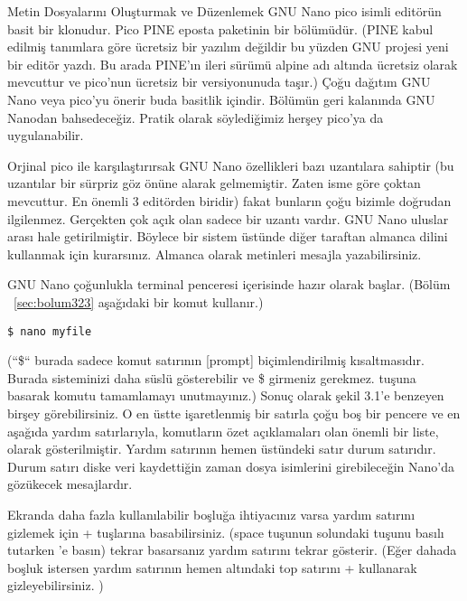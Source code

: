 \begin{section}{Metin Dosyalarını Oluşturmak ve Düzenlemek}
GNU Nano pico isimli editörün basit bir klonudur. Pico PINE eposta paketinin bir bölümüdür. (PINE kabul edilmiş tanımlara göre ücretsiz bir yazılım değildir bu yüzden GNU projesi yeni bir editör yazdı. Bu arada PINE’ın ileri sürümü alpine adı altında ücretsiz olarak mevcuttur ve pico’nun ücretsiz bir versiyonunuda taşır.) Çoğu dağıtım GNU Nano veya pico’yu önerir buda basitlik içindir. Bölümün geri kalanında GNU Nanodan bahsedeceğiz. Pratik olarak söylediğimiz herşey pico'ya da uygulanabilir.

Orjinal pico ile karşılaştırırsak GNU Nano özellikleri bazı uzantılara sahiptir (bu uzantılar bir sürpriz göz önüne alarak gelmemiştir. Zaten isme göre çoktan mevcuttur. En önemli 3 editörden biridir) fakat bunların çoğu bizimle doğrudan ilgilenmez. Gerçekten çok açık olan sadece bir uzantı vardır. GNU Nano uluslar arası hale getirilmiştir. Böylece bir sistem üstünde diğer taraftan almanca dilini kullanmak için kurarsınız.  Almanca olarak metinleri mesajla yazabilirsiniz.

GNU Nano çoğunlukla terminal penceresi içerisinde hazır olarak başlar. (Bölüm ~\ref{sec:bolum323} aşağıdaki bir komut kullanır.)

\begin{verbatim}
$ nano myfile
\end{verbatim}

(“\$“ burada sadece komut satırının [prompt] biçimlendirilmiş kısaltmasıdır. Burada sisteminizi daha süslü gösterebilir ve \$ girmeniz gerekmez. \Return tuşuna basarak komutu tamamlamayı unutmayınız.) Sonuç olarak şekil 3.1’e benzeyen birşey görebilirsiniz. O en üstte işaretlenmiş bir satırla çoğu boş bir pencere ve en aşağıda yardım satırlarıyla, komutların özet açıklamaları olan önemli bir liste, olarak gösterilmiştir. Yardım satırının hemen üstündeki satır durum satırıdır. Durum satırı diske veri kaydettiğin zaman dosya isimlerini girebileceğin Nano'da gözükecek mesajlardır. 

Ekranda daha fazla kullanılabilir boşluğa ihtiyacınız varsa yardım satırını gizlemek için \Alt +  tuşlarına basabilirsiniz. (space tuşunun solundaki \Alt tuşunu basılı tutarken ’e basın) tekrar basarsanız yardım satırını tekrar gösterir. (Eğer dahada boşluk istersen yardım satırının hemen altındaki top satırını \Alt +  kullanarak gizleyebilirsiniz. )


\end{section}
